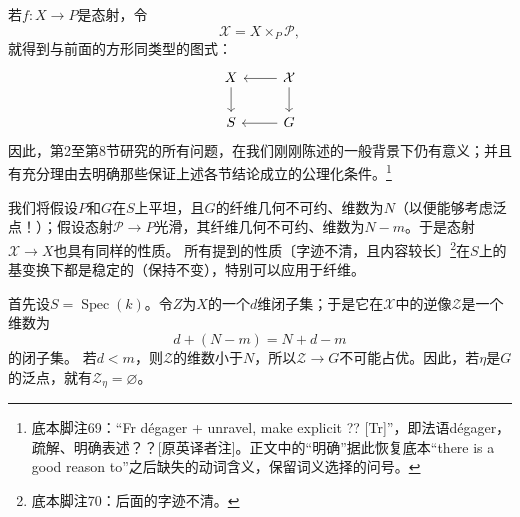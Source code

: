 若$f:X\to P$是态射，令
\[
\mathcal X=X\times_P\mathcal P,
\]
就得到与前面的方形同类型的图式：
\[
\begin{tikzcd}
X \arrow[d] & \mathcal X \arrow[l] \arrow[d] \\
S & G \arrow[l]
\end{tikzcd}
\]
因此，第2至第8节研究的所有问题，在我们刚刚陈述的一般背景下仍有意义；并且有充分理由去明确那些保证上述各节结论成立的公理化条件。\footnote{底本脚注69：“Fr dégager + unravel, make explicit ?? [Tr]”，即法语dégager，疏解、明确表述？？[原英译者注]。正文中的“明确”据此恢复底本“there is a good reason to”之后缺失的动词含义，保留词义选择的问号。}

我们将假设$P$和$G$在$S$上平坦，且$G$的纤维几何不可约、维数为$N$（以便能够考虑泛点！）；假设态射$\mathcal P\to P$光滑，其纤维几何不可约、维数为$N-m$。于是态射$\mathcal X\to X$也具有同样的性质。
所有提到的性质〔字迹不清，且内容较长〕\footnote{底本脚注70：后面的字迹不清。}在$S$上的基变换下都是稳定的（保持不变），特别可以应用于纤维。

首先设$S=\operatorname{Spec}(k)$。令$Z$为$X$的一个$d$维闭子集；于是它在$\mathcal X$中的逆像$\mathcal Z$是一个维数为
\[
d+(N-m)=N+d-m
\]
的闭子集。
若$d<m$，则$\mathcal Z$的维数小于$N$，所以$\mathcal Z\to G$不可能占优。因此，若$\eta$是$G$的泛点，就有$\mathcal Z_\eta=\varnothing$。


